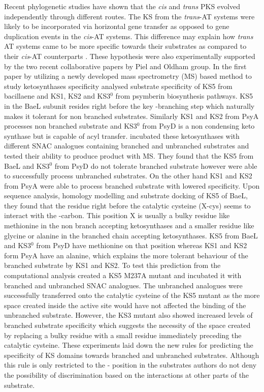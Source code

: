 			Recent phylogenetic studies have shown that the \textit{cis} and \textit{trans} PKS evolved independently through different routes. The KS from the \textit{trans}-AT systems were likely to be incorporated via horizontal gene transfer as opposed to gene duplication events in the \textit{cis}-AT systems. This difference may explain how \textit{trans} AT systems came to be more specific towards their substrates as compared to their \textit{cis}-AT counterparts \parencite{Nguyen2008}. These hypothesis were also experimentally supported by the two recent collaborative papers by Piel and Oldham group. In the first paper by \textcite{Jenner2013} utilizing a newly developed mass spectrometry (MS) based method to study ketosynthases specificity analysed substrate specificity of KS5 from bacillaene and KS1, KS2 and KS3$^{0}$  from psymberin biosynthesis pathways. KS5 in the BaeL subunit resides right before the key \bet-branching step which naturally makes it tolerant for non branched substrates. Similarly KS1 and KS2 from PsyA processes non branched substrate and KS3$^{0}$ from PsyD is a non condensing keto synthase but is capable of acyl transfer. \textcite{Jenner2013} incubated these ketosynthases with different SNAC analogues containing branched and unbranched substrates and tested their ability to produce product with MS. They found that the KS5 from BaeL and KS3$^{0}$ from PsyD do not tolerate branched substrate however were able to successfully process unbranched substrates. On the other hand KS1 and KS2 from PsyA were able to process branched substrate with lowered specificity. Upon sequence analysis, homology modelling and substrate docking of KS5 of BaeL, they found that the residue right before the catalytic cysteine (X-cys) seems to interact with the \bet-carbon. This position X is usually a bulky residue like methionine in the non branch accepting ketosynthases and a smaller residue like glycine or alanine in the branched chain accepting ketosynthases. KS5 from BaeL and KS3$^{0}$ from PsyD  have methionine on that position whereas KS1 and KS2 form PsyA have an alanine, which explains the more tolerant behaviour of the branched substrate by KS1 and KS2. To test this prediction from the computational analysis \textcite{Jenner2013} created a KS5 M237A mutant and incubated it with branched and unbranched SNAC analogues. The unbranched analogues were successfully transferred onto the catalytic cysteine of the KS5 mutant as the more space created inside the active site would have not affected the binding of the unbranched substrate. However, the KS3 mutant also showed increased levels of branched substrate specificity which suggests the necessity of the space created by replacing a bulky residue with a small residue immediately preceding the catalytic cysteine. These experiments laid down the new rules for predicting the specificity of KS domains towards branched and unbranched substrates. Although this rule is only restricted to the \bet- position in the substrates authors do not deny the possibility of discrimination based on the interactions at other parts of the substrate. 
			
